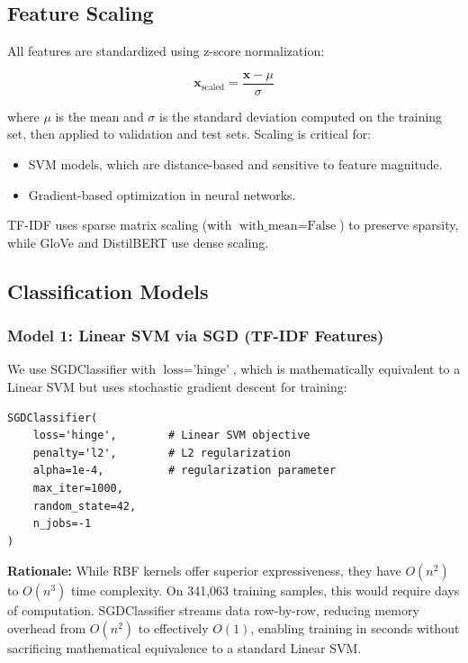 \documentclass[12pt, a4paper]{article}
\begin{document}
\subsection{Feature Scaling}

All features are standardized using z-score normalization:

\begin{equation}
\mathbf{x}_{\text{scaled}} = \frac{\mathbf{x} - \mu}{\sigma}
\end{equation}

where $\mu$ is the mean and $\sigma$ is the standard deviation computed on the training set, then applied to validation and test sets. Scaling is critical for:
\begin{itemize}
    \item SVM models, which are distance-based and sensitive to feature magnitude.
    \item Gradient-based optimization in neural networks.
\end{itemize}

TF-IDF uses sparse matrix scaling (with $\text{with\_mean}=\text{False}$) to preserve sparsity, while GloVe and DistilBERT use dense scaling.

\subsection{Classification Models}

\subsubsection{Model 1: Linear SVM via SGD (TF-IDF Features)}

We use SGDClassifier with $\text{loss}=\text{'hinge'}$, which is mathematically equivalent to a Linear SVM but uses stochastic gradient descent for training:

\begin{lstlisting}
SGDClassifier(
    loss='hinge',        # Linear SVM objective
    penalty='l2',        # L2 regularization
    alpha=1e-4,          # regularization parameter
    max_iter=1000,
    random_state=42,
    n_jobs=-1
)
\end{lstlisting}

\textbf{Rationale:} While RBF kernels offer superior expressiveness, they have $O(n^2)$ to $O(n^3)$ time complexity. On 341,063 training samples, this would require days of computation. SGDClassifier streams data row-by-row, reducing memory overhead from $O(n^2)$ to effectively $O(1)$, enabling training in seconds without sacrificing mathematical equivalence to a standard Linear SVM.
\end{document}
